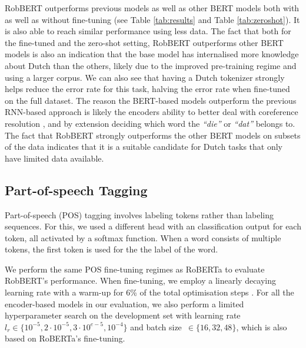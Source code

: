 \documentclass[11pt,a4paper]{article}
\begin{document}
RobBERT outperforms previous models as well as other BERT models both with as well as without fine-tuning (see Table \ref{tab:results} and Table \ref{tab:zeroshot}).
It is also able to reach similar performance using less data.
The fact that both for the fine-tuned and the zero-shot setting, RobBERT outperforms other BERT models is also an indication that the base model has internalised more knowledge about Dutch than the others, likely due to the improved pre-training regime and using a larger corpus.
We can also see that having a Dutch tokenizer strongly helps reduce the error rate for this task, halving the error rate when fine-tuned on the full dataset.
The reason the BERT-based models outperform the previous RNN-based approach is likely the encoders ability to better deal with coreference resolution \citep{joshi2019spanbert}, and by extension deciding which word the \textit{``die''} or \textit{``dat''} belongs to.
The fact that RobBERT strongly outperforms the other BERT models on subsets of the data indicates that it is a suitable candidate for Dutch tasks that only have limited data available.







\subsection{Part-of-speech Tagging}
\label{ss:pos}

Part-of-speech (POS) tagging involves labeling tokens rather than labeling sequences.
For this, we used a different head with an classification output for each token, all activated by a softmax function. 
When a word consists of multiple tokens, the first token is used for the the label of the word. 




We perform the same POS fine-tuning regimes as RoBERTa \citep{liuRoBERTa2019} to evaluate RobBERT's performance.
When fine-tuning, we employ a linearly decaying learning rate with a warm-up for 6\% of the total optimisation steps \citep{liuRoBERTa2019}.
For all the encoder-based models in our evaluation, we also perform a limited hyperparameter search on the development set with learning rate $l_r \in \{10^{-5}, 2\cdot 10^{-5}, 3\cdot 10^{e-5}, 10^{-4}\}$ and batch size~$\in \{16, 32, 48\}$, which is also based on RoBERTa's fine-tuning.
\end{document}
